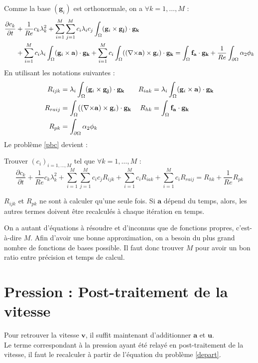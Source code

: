 Comme la base $(\mathbf{g}_i)$ est orthonormale, on a $\forall k=1,\dots,M$ :
\begin{align*}
\frac{\partial c_k}{\partial t} &+ \frac{1}{Re}c_k\lambda_k^2 + \sum_{i=1}^M\sum_{j=1}^Mc_i\lambda_ic_j\int_\Omega(\mathbf{g}_i\times \mathbf{g_j})\cdot\mathbf{g_k}\\
& + \sum_{i=1}^Mc_i\lambda_i\int_\Omega(\mathbf{g}_i\times \mathbf{a})\cdot\mathbf{g_k} +  \sum_{i=1}^Mc_i\int_\Omega(({\nabla\times}\mathbf{a})\times \mathbf{g}_i)\cdot\mathbf{g_k} = \int_\Omega\mathbf{f_a}\cdot\mathbf{g_k}+\frac{1}{Re}\int_{\partial\Omega} \alpha_2\phi_k\\
\end{align*}
En utilisant les notations suivantes :
\begin{align*}
R_{ijk} &= \lambda_i\int_\Omega(\mathbf{g}_i\times \mathbf{g_j})\cdot\mathbf{g_k} & R_{iak} &= \lambda_i\int_\Omega(\mathbf{g}_i\times \mathbf{a})\cdot\mathbf{g_k}\\
R_{raij} &= \int_\Omega(({\nabla\times}\mathbf{a})\times \mathbf{g}_i)\cdot\mathbf{g_k} & R_{hk} &= \int_\Omega\mathbf{f_a}\cdot\mathbf{g_k}\\
R_{pk} &= \int_{\partial\Omega} \alpha_2\phi_k
\end{align*}
Le problème \ref{pbc} devient :
\begin{pb}\label{fvc}
Trouver $(c_i)_{i=1,\dots,M}$ tel que $\forall k=1,\dots,M$ :
\begin{equation*}
\frac{\partial c_k}{\partial t} + \frac{1}{Re}c_k\lambda_k^2 + \sum_{i=1}^M\sum_{j=1}^Mc_ic_jR_{ijk} + \sum_{i=1}^Mc_iR_{iak} + \sum_{i=1}^Mc_iR_{raij} = R_{hk} + \frac{1}{Re}R_{pk}
\end{equation*}\end{pb}

\begin{rk}
$R_{ijk}$ et $R_{pk}$ ne sont à calculer qu'une seule fois. Si $\mathbf{a}$ dépend du temps, alors, les autres termes doivent être recalculés à chaque itération en temps.
\end{rk}
\begin{rk}
On a autant d'équations à résoudre et d'inconnus que de fonctions propres, c'est-à-dire $M$. Afin d'avoir une bonne approximation, on a besoin du plus grand nombre de fonctions de bases possible. Il faut donc trouver $M$ pour avoir un bon ratio entre précision et temps de calcul.
\end{rk}

\section{Pression : Post-traitement de la vitesse}
\label{pression}
Pour retrouver la vitesse $\mathbf{v}$, il suffit maintenant d'additionner $\mathbf{a}$ et $\mathbf{u}$.\\
Le terme correspondant à la pression ayant été relayé en post-traitement de la vitesse, il faut le recalculer à partir de l'équation du problème \ref{depart}.

